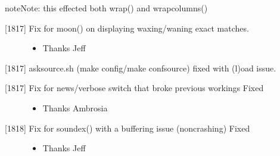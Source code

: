 \documentclass[letterpaper,10pt,english]{sphinxmanual}
\begin{document}
\begin{sphinxadmonition}{note}{Note:}
\sphinxAtStartPar
this effected both wrap() and wrapcolumns()
\end{sphinxadmonition}
\begin{description}
\item[{{[}18\sphinxhyphen{}17{]} Fix for moon() on displaying waxing/waning exact matches.}] \leavevmode\begin{itemize}
\item {} 
\sphinxAtStartPar
Thanks Jeff

\end{itemize}

\end{description}

\sphinxAtStartPar
{[}18\sphinxhyphen{}17{]} asksource.sh (make config/make confsource) fixed with (l)oad issue.
\begin{description}
\item[{{[}18\sphinxhyphen{}17{]} Fix for news/verbose switch that broke previous workings \sphinxhyphen{} Fixed}] \leavevmode\begin{itemize}
\item {} 
\sphinxAtStartPar
Thanks Ambrosia

\end{itemize}

\item[{{[}18\sphinxhyphen{}18{]} Fix for soundex() with a buffering issue (non\sphinxhyphen{}crashing) \sphinxhyphen{} Fixed}] \leavevmode\begin{itemize}
\item {} 
\sphinxAtStartPar
Thanks Jeff

\end{itemize}

\end{description}
\end{document}
